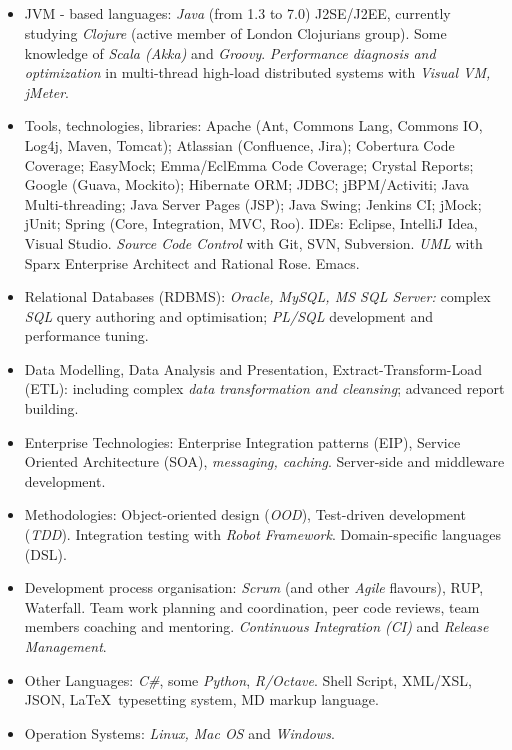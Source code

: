 \documentclass{res}
\newcommand{\osection}[1]{\section{\sc {\Large \textbf{#1}\\}} \vspace{0.30cm}}
\newcommand{\profileItem}[2]{\item {\sc #1:} #2.}
\newcommand{\emp}[1]{{\em#1}}
\newif\ifFullVersion
\begin{document}
\begin{resume}
\osection{Technical Profile}
\begin{itemize}
\ifFullVersion
  \profileItem {Full software development lifecycle (SLDC)} {requirement gathering and analysis, design, prototyping, implementation, performance tuning, quality assurance (QA) organisation, release management}
  \profileItem {Development process organisation} {\emp{Scrum} (and other \emp{Agile} flavours), RUP, Waterfall. Team work planning and coordination, peer code reviews, team members coaching and mentoring. \emp{Continuous Integration (CI)} and \emp{Release Management}}
\fi
  \profileItem {JVM - based languages} {\emp{Java} (from 1.3 to 7.0) J2SE/J2EE, currently studying \emp{Clojure} (active member of London Clojurians group). Some knowledge of \emp{Scala (Akka)} and \emp{Groovy}. \emp{Performance diagnosis and optimization} in multi-thread high-load distributed systems with \emp{Visual VM, jMeter}}
  \profileItem {Tools, technologies, libraries} {Apache (Ant, Commons Lang, Commons IO, Log4j, Maven, Tomcat); Atlassian (Confluence, Jira); Cobertura Code Coverage; EasyMock; Emma/EclEmma Code Coverage; Crystal Reports; Google (Guava, Mockito); Hibernate ORM; JDBC; jBPM/Activiti; Java Multi-threading; Java Server Pages (JSP); Java Swing; Jenkins CI; jMock; jUnit; Spring (Core, Integration, MVC, Roo). IDEs: Eclipse, IntelliJ Idea, Visual Studio. \emp{Source Code Control} with Git, SVN, Subversion. \emp{UML} with Sparx Enterprise Architect and Rational Rose. Emacs}
  \profileItem {Relational Databases (RDBMS)} {\emp{Oracle, MySQL, MS SQL Server:} complex \emp{SQL} query authoring and optimisation; \emp{PL/SQL} development and performance tuning}
  \profileItem{Data Modelling, Data Analysis and Presentation, Extract-Transform-Load (ETL)} {including complex \emp{data transformation and cleansing}; advanced report building}
  \profileItem{Enterprise Technologies} {Enterprise Integration patterns (EIP), Service Oriented Architecture (SOA), \emp{messaging, caching}. Server-side and middleware development}
  \profileItem{Methodologies} {Object-oriented design (\emp{OOD}), Test-driven development (\emp{TDD}). Integration testing with \emp{Robot Framework}. Domain-specific languages (DSL)}
\ifFullVersion
Strong interest in \emp{functional programming}, Data Science and Machine Learning / Business Intelligence systems.
\else
  \profileItem{Development process organisation} {\emp{Scrum} (and other \emp{Agile} flavours), RUP, Waterfall. Team work planning and coordination, peer code reviews, team members coaching and mentoring. \emp{Continuous Integration (CI)} and \emp{Release Management}}
\fi
  \profileItem{Other Languages} {\emp{C\#}, some \emp{Python}, \emp{R/Octave}. Shell Script, XML/XSL, JSON, \LaTeX ~typesetting system, MD markup language}
  \profileItem{Operation Systems} {\emp{Linux, Mac OS} and \emp{Windows}}
\end{itemize}


\end{resume}
\end{document}
